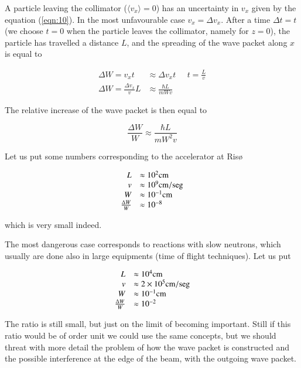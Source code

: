 \documentclass[a4paper,14pt]{book}
\begin{document}
A particle leaving the collimator ($\langle v_x \rangle = 0$) has an uncertainty in $v_x$ given by the equation (\ref{eqn:10}). In the most unfavourable case $v_x = \Delta v_x$. After a time $\Delta t = t$ (we choose $t=0$ when the particle leaves the collimator, namely for $z=0$), the particle has travelled a distance $L$, and the spreading of the wave packet along $x$ is equal to

\begin{equation}
\begin{array}{rl}
\Delta W = v_x t &\approx \Delta v_x t \;\;\;\;\; t = \frac{L}{v} \\
\Delta W = \frac{\Delta v_x}{v} L &\approx \frac{\hbar L}{m W v}
\end{array}
\end{equation}

\noindent The relative increase of the wave packet is then equal to

\begin{equation}
\frac{\Delta W}{W} \approx \frac{\hbar L}{m W^2 v}
\end{equation}

\noindent Let us put some numbers corresponding to the accelerator at Ris\o

\begin{equation}
\begin{array}{rl}
L &\approx 10^2 {\rm cm} \\
v &\approx 10^9 {\rm cm/seg} \\
W &\approx 10^{-1} {\rm cm} \\
\frac{\Delta W}{W} &\approx 10^{-8}
\end{array}
\end{equation}

\noindent which is very small indeed.

The most dangerous case corresponds to reactions with slow neutrons, which usually are done also in large equipments (time of flight techniques). Let us put

\begin{equation}
\begin{array}{rl}
L &\approx 10^4 {\rm cm} \\
v &\approx 2 \times 10^5 {\rm cm/seg} \\
W &\approx 10^{-1} {\rm cm} \\
\frac{\Delta W}{W} &\approx 10^{-2}
\end{array}
\end{equation}

The ratio is still small, but just on the limit of becoming important. Still if this ratio would be of order unit we could use the same concepts, but we should threat with more detail the problem of how the wave packet is constructed and the possible interference at the edge of the beam, with the outgoing wave packet.
\end{document}
